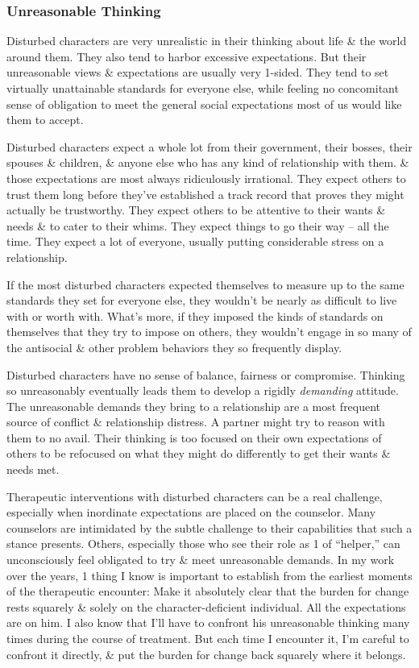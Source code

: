 \documentclass{article}
\numberwithin{equation}{section}
\begin{document}
\subsubsection{Unreasonable Thinking}
Disturbed characters are very unrealistic in their thinking about life \& the world around them. They also tend to harbor excessive expectations. But their unreasonable views \& expectations are usually very 1-sided. They tend to set virtually unattainable standards for everyone else, while feeling no concomitant sense of obligation to meet the general social expectations most of us would like them to accept.

Disturbed characters expect a whole lot from their government, their bosses, their spouses \& children, \& anyone else who has any kind of relationship with them. \& those expectations are most always ridiculously irrational. They expect others to trust them long before they've established a track record that proves they might actually be trustworthy. They expect others to be attentive to their wants \& needs \& to cater to their whims. They expect things to go their way -- all the time. They expect a lot of everyone, usually putting considerable stress on a relationship.

If the most disturbed characters expected themselves to measure up to the same standards they set for everyone else, they wouldn't be nearly as difficult to live with or worth with. What's more, if they imposed the kinds of standards on themselves that they try to impose on others, they wouldn't engage in so many of the antisocial \& other problem behaviors they so frequently display.

Disturbed characters have no sense of balance, fairness or compromise. Thinking so unreasonably eventually leads them to develop a rigidly \textit{demanding} attitude. The unreasonable demands they bring to a relationship are a most frequent source of conflict \& relationship distress. A partner might try to reason with them to no avail. Their thinking is too focused on their own expectations of others to be refocused on what they might do differently to get their wants \& needs met.

Therapeutic interventions with disturbed characters can be a real challenge, especially when inordinate expectations are placed on the counselor. Many counselors are intimidated by the subtle challenge to their capabilities that such a stance presents. Others, especially those who see their role as 1 of ``helper,'' can unconsciously feel obligated to try \& meet unreasonable demands. In my work over the years, 1 thing I know is important to establish from the earliest moments of the therapeutic encounter: Make it absolutely clear that the burden for change rests squarely \& solely on the character-deficient individual. All the expectations are on him. I also know that I'll have to confront his unreasonable thinking many times during the course of treatment. But each time I encounter it, I'm careful to confront it directly, \& put the burden for change back squarely where it belongs.
\end{document}
